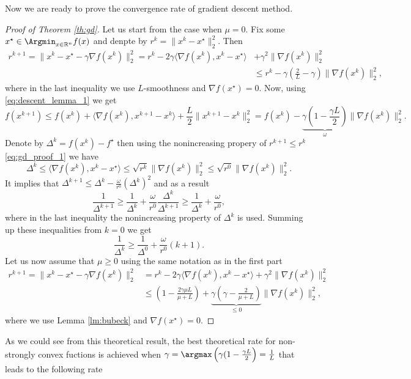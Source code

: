 Now we are ready to prove the convergence rate of gradient descent method.
\begin{proof}[Proof of Theorem \ref{th:gd}]
Let us start from the case when $\mu = 0$. Fix some $x^\star\in\Argmin_{x\in\mathbb{R}^n} f(x)$ and denpte by $r^k = \|x^k-x^\star\|^2_2$.
Then 
\begin{align}\label{eq:gd_proof_1}
r^{k+1} = \|x^k - x^\star - \gamma\nabla f(x^k)\|_2^2 = r^k - 2\gamma\langle \nabla f(x^k), x^k - x^\star\rangle &+ \gamma^2\|\nabla f(x^k)\|_2^2\nonumber\\
&\leq r^k - \gamma\left(\frac2L - \gamma\right)\|\nabla f(x^k)\|_2^2,
\end{align}
where in the last inequality we use $L$-smoothness and $\nabla f(x^\star) = 0$. Now, using \eqref{eq:descent_lemma_1} we get
$$
f(x^{k+1})\leq f(x^k) + \langle \nabla f(x^k), x^{k+1} - x^k\rangle + \frac{L}{2}\|x^{k+1}- x^k\|_2^2 = f(x^k) - \underbrace{\gamma\left(1 - \frac{\gamma L}{2}\right)}_{\omega}\|\nabla f(x^k)\|_2^2.
$$
Denote by $\Delta^k = f(x^k)-f^\star$ then using the nonincreasing propery of $r^{k+1}\leq r^k$ \eqref{eq:gd_proof_1} we have
$$
\Delta^k \leq\langle\nabla f(x^k), x^k-x^\star\rangle\leq \sqrt{r^k}\|\nabla f(x^k)\|_2^2\leq \sqrt{r^0}\|\nabla f(x^k)\|_2^2.
$$
It implies that $\Delta^{k+1}\leq\Delta^k - \frac{\omega}{r^0}(\Delta^k)^2$ and as a result
$$
\frac{1}{\Delta^{k+1}}\geq \frac{1}{\Delta^k} + \frac{\omega}{r^0}\frac{\Delta^k}{\Delta^{k+1}}\geq \frac{1}{\Delta^k} + \frac{\omega}{r^0},
$$
where in the last inequality the nonincreasing property of $\Delta^k$ is used.
Summing up these inequalities from $k=0$ we get
$$
\frac{1}{\Delta^k}\geq \frac{1}{\Delta^0} + \frac{\omega}{r^0}(k+1).
$$
Let us now assume that $\mu\geq 0$ using the same notation as in the first part
\begin{align}
r^{k+1} = \|x^k - x^\star - \gamma \nabla f(x^k)\|_2^2 &= r^k - 2\gamma\langle \nabla f(x^k), x^k - x^\star\rangle + \gamma^2\|\nabla f(x^k)\|_2^2\nonumber\\
&\leq \left(1-\frac{2\gamma\mu L}{\mu + L}\right) + \underbrace{\gamma\left(\gamma - \frac{2}{\mu + L}\right)}_{\leq 0}\|\nabla f(x^k)\|_2^2,
\end{align}
where we use Lemma \ref{lm:bubeck} and $\nabla f(x^\star) = 0$.
\end{proof}
As we could see from this theoretical result, the best theoretical rate for non-strongly convex fuctions is achieved when $\gamma = \argmax\left(\gamma(1 - \frac{\gamma L}{2}\right) = \frac{1}{L}$ that leads to the following rate
